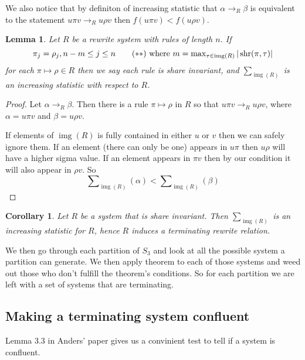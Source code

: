 \documentclass[a4paper, 11pt, english]{article}
\newcommand{\patternrule}{ \mapsto \!}
\newtheorem{lemma}[theorem]{Lemma}
\newtheorem{corollary}[theorem]{Corollary}
\theoremstyle{definition}
\newcommand{\Sym}{S}
\DeclareMathOperator{\img}{img}
\DeclareMathOperator{\shr}{shr}
\begin{document}
We also notice that by definiton of increasing statistic that
$\alpha \to_R \beta$ is equivalent to the statement $u \pi v \to_R u \rho v$
then $f(u \pi v) < f(u \rho v)$.

\begin{lemma}
    Let $R$ be a rewrite system with rules of length $n$. If
    \[
        \pi_j = \rho_j, n-m \leq j \leq n \tag{$\ast\ast$} \  \textnormal{where}
        \ m = \max\nolimits_{\tau \in \img(R)} |\shr(\pi, \tau)|\label{shareinvariance}
    \]
    for each $\pi \patternrule \rho \in R$ then we say each rule is \emph{share
    invariant}, and $\sum_{\img(R)}$ is an increasing statistic with respect to $R$. 
\end{lemma}
\begin{proof}
    Let $\alpha \to_R \beta$. Then there is a rule $\pi \patternrule \rho$ in
    $R$ so that $u \pi v \to_R u \rho v$, where $\alpha = u \pi v$ and $\beta =
    u \rho v$. 

    If elements of $\img(R)$ is fully contained in either $u$ or $v$ then we
    can safely ignore them. If an element (there can only be one) appears in $u\pi$ then
    $u \rho$ will have a higher sigma value. If an element appears in $\pi v$
    then by our condition it will also appear in $\rho v$.
    So
    \[
        \sum\nolimits_{\img(R)}(\alpha) < \sum\nolimits_{\img(R)}(\beta)
    \]
\end{proof}

\begin{corollary}
    Let $R$ be a system that is share invariant. Then $\sum_{\img(R)}$ is an
    increasing statistic for $R$, hence $R$ induces a terminating rewrite relation.
\end{corollary}

We then go through each partition of $\Sym_3$ and look at all the possible
system a partition can generate. We then apply theorem to each of those systems
and weed out those who don't fulfill the theorem's conditions. So for each
partition we are left with a set of systems that are terminating.

\subsection{Making a terminating system confluent}
Lemma $3.3$ in Anders' paper gives us a convinient test to tell if a system is
confluent. 
\end{document}
